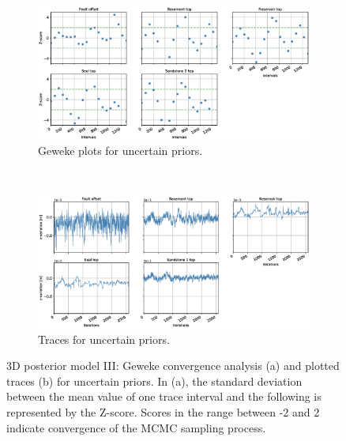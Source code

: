 \documentclass[a4paper,11pt]{MScThesis}
\begin{document}
	\begin{figure}[h]
		\begin{subfigure}{1\textwidth}
			\centering
			\includegraphics[width=1\linewidth]{Figures/Appendix/ML2/Geweke_ML2.eps}
			\caption{Geweke plots for uncertain priors.}
		\end{subfigure}%
		\\
		\begin{subfigure}{1\textwidth}
			\centering
			\includegraphics[width=1\linewidth]{Figures/Appendix/ML2/Traces_ML2.eps}
			\caption{Traces for uncertain priors.}
		\end{subfigure}
		\caption{3D posterior model III: Geweke convergence analysis (a) and plotted traces (b) for uncertain priors. In (a), the standard deviation between the mean value of one trace interval and the following is represented by the Z-score. Scores in the range between -2 and 2 indicate convergence of the MCMC sampling process.}
		\label{fig:gew_ML3}
	\end{figure}
	
\end{document}

